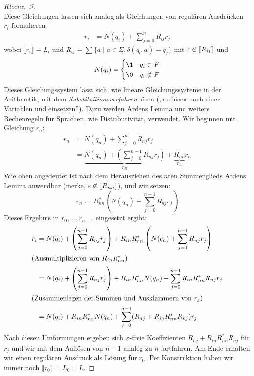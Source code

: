 \begin{proof}[Kleene, \=>]
\begin{displaymath}
    \end{displaymath}
    Diese Gleichungen lassen sich analog als Gleichungen von regulären Ausdrücken $r_i$ formulieren:
    \begin{align*}
      r_i &= N(q_i) + \sum_{j = 0}^n R_{ij} r_j
    \end{align*}
    wobei $\llbracket r_i \rrbracket = L_i$ und $R_{ij } = \sum \{a \mid a \in \Sigma, \delta(q_i, a) = q_j\}$ mit $\varepsilon \not \in \llbracket R_{ij} \rrbracket$ und
    \begin{displaymath}
      N(q_i) =
      \begin{cases}
        \1 & q_i\in F\\
        \0 & q_i\notin F
      \end{cases}
    \end{displaymath}
    Dieses Gleichungssystem lässt sich, wie lineare Gleichungssysteme in der Arithmetik, mit dem \emph{Substituitionsverfahren} lösen (,,auflösen nach einer Variablen und einsetzen'').
    Dazu werden Ardens Lemma und weitere Rechenregeln für Sprachen, wie Distributivität, verwendet.
    Wir beginnen mit Gleichung $r_n$:
    \begin{align*}
      r_n &= N(q_n) + \sum_{j = 0}^n R_{nj} r_j \\
          &= \underbrace{N(q_n) + \left (\sum_{j = 0}^{n-1} R_{nj} r_j \right)}_{r_B} + \underbrace{R_{nn}}_{r_A} r_n
    \end{align*}
    Wie oben angedeutet ist nach dem Herausziehen des $n$ten Summenglieds Ardens Lemma anwendbar (merke, $\varepsilon \not \in \llbracket R_{nn} \rrbracket$), und wir setzen:
    \begin{displaymath}
      r_n := R_{nn}^*\left(N(q_n) + \sum_{j = 0}^{n-1} R_{nj} r_j  \right)
    \end{displaymath}
    Dieses Ergebnis in $r_0,\ldots,r_{n-1}$ eingesetzt ergibt:
    \begin{align*}
      r_i &= N(q_i) + \left (\sum_{j = 0}^{n-1} R_{nj} r_j \right) + R_{in}R_{nn}^*\left(N(q_n) + \sum_{j = 0}^{n-1} R_{nj} r_j  \right) \\
      \intertext{(Ausmultiplizieren von $R_{in}R_{nn}^*$)}
          &= N(q_i) + \left (\sum_{j = 0}^{n-1} R_{nj} r_j \right) + R_{in}R_{nn}^*N(q_n) + \sum_{j = 0}^{n-1} R_{in}R_{nn}^*R_{nj} r_j  \\
      \intertext{(Zusammenlegen der Summen und Ausklammern von $r_j$)}
          &= N(q_i) + R_{in}R_{nn}^*N(q_n) + \sum_{j = 0}^{n-1} (R_{nj} + R_{in}R_{nn}^*R_{nj}) r_j  \\
    \end{align*}
  Nach diesen Umformungen ergeben sich $\varepsilon$-freie Koeffizienten $R_{nj} + R_{in}R_{nn}^*R_{nj}$ für $r_j$ und wir mit dem Auflösen von $n-1$ analog zu $n$ fortfahren.
  Am Ende erhalten wir einen regulären Ausdruck als Lösung für $r_0$.
  Per Konstruktion haben wir immer noch $\llbracket r_0 \rrbracket = L_0 = L$.
  \end{proof}
    


